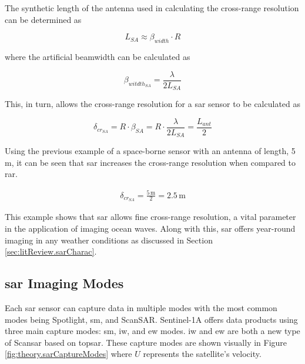 The synthetic length of the antenna \cite{Meyer2019} used in calculating the cross-range resolution can be determined as

\begin{equation} \label{eq:sar.virtualAntennaL}
    L_{SA} \approx \beta_{width}\cdot R 
\end{equation}

where the artificial beamwidth can be calculated as

\begin{equation} \label{eq:sar.beamwidth}
    \beta_{witdth_{SA}} = \frac{\lambda}{2L_{SA}}
\end{equation}

This, in turn, allows the cross-range resolution \cite{Moreira2013} for a \acs{sar} sensor to be calculated as

\begin{equation} \label{eq:sar.crossRangeResolution}
    \delta_{cr_{SA}} = R\cdot \beta_{SA} = R \cdot \frac{\lambda}{2L_{SA}} = \frac{L_{ant}}{2}
\end{equation}

Using the previous example of a space-borne sensor with an antenna of length, 5\,m, it can be seen that \acs{sar} increases the cross-range resolution when compared to \acs{rar}.

\begin{gather*}
    \delta_{cr_{SA}} = \frac{5\,\text{m}}{2} = 2.5\,\text{m}
\end{gather*}

This example shows that \acs{sar} allows fine cross-range resolution, a vital parameter in the application of imaging ocean waves. Along with this, \acs{sar} offers year-round imaging in any weather conditions as discussed in Section \ref{sec:litReview.sarCharac}.

\subsection{\acs{sar} Imaging Modes} \label{subsec:theory.sar.imaging}

Each \acs{sar} sensor can capture data in multiple modes with the most common modes being Spotlight, \ac{sm}, and ScanSAR. Sentinel-1A offers data products using three main capture modes: \acs{sm}, \ac{iw}, and \ac{ew} modes. \ac{iw} and \ac{ew} are both a new type of Scan\acs{sar} based on \ac{topsar}. These capture modes are shown visually in Figure \ref{fig:theory.sarCaptureModes} where $U$ represents the satellite's velocity.

